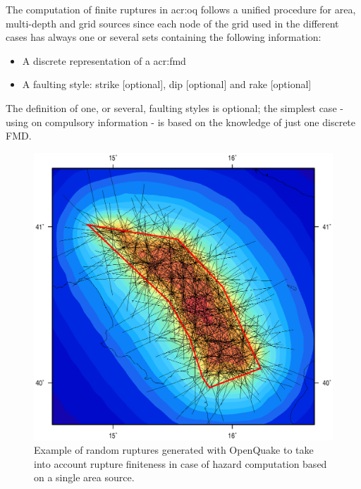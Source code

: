 {The computation of finite ruptures in \gls{acr:oq} follows a unified 
procedure for area, multi-depth and grid sources since each node
of the grid used in the different cases has always one or several 
sets containing the following information:
%
\begin{itemize}
\item A discrete representation of a \gls{acr:fmd} 
\item A faulting style: strike [optional], dip [optional] and rake 
[optional] 
\end{itemize}
%
The definition of one, or several, faulting styles is optional; the 
simplest case - using on compulsory information - is based on the 
knowledge of just one discrete FMD.
%
\begin{figure}[!hb]
\centering
\includegraphics[width=13cm]{./Figures/Part_Hazard/area_source_finite_ruptures.eps}
\caption{Example of random ruptures generated with OpenQuake to take 
into account rupture finiteness in case of hazard computation based 
on a single area source.}
\label{fig:area_source_finite_ruptures}
\end{figure}
%

}
